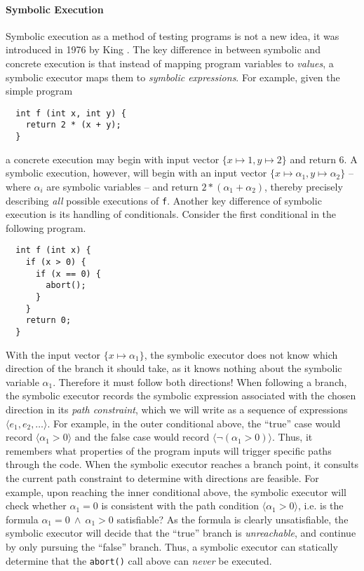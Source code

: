 \paragraph{Symbolic Execution}
Symbolic execution as a method of testing programs is not a new idea, it
was introduced in 1976 by King \cite{king_symbolic_1976}.
%
The key difference in between symbolic and concrete execution is that
instead of mapping program variables to \emph{values}, a symbolic
executor maps them to \emph{symbolic expressions}.
%
For example, given the simple program
%
\begin{verbatim}
  int f (int x, int y) {
    return 2 * (x + y);
  }
\end{verbatim}
%
a concrete execution may begin with input vector
$\{x \mapsto 1, y \mapsto 2\}$ and return $6$.
%
A symbolic execution, however, will begin with an input vector
$\{x \mapsto \alpha_1, y \mapsto \alpha_2\}$ -- where $\alpha_i$ are
symbolic variables -- and return $2 * (\alpha_1 + \alpha_2)$, thereby
precisely describing \emph{all} possible executions of \verb~f~.
%
Another key difference of symbolic execution is its handling of
conditionals. Consider the first conditional in the following program.
%
\begin{verbatim}
  int f (int x) {
    if (x > 0) {
      if (x == 0) {
        abort();
      }
    }
    return 0;
  }
\end{verbatim}
%
With the input vector $\{x \mapsto \alpha_1\}$, the symbolic executor
does not know which direction of the branch it should take, as it knows
nothing about the symbolic variable $\alpha_1$.
%
Therefore it must follow both directions!
%
When following a branch, the symbolic executor records the symbolic
expression associated with the chosen direction in its \emph{path
  constraint}, which we will write as a sequence of expressions
$\langle e_1, e_2, \ldots \rangle$.
%
For example, in the outer conditional above, the ``true'' case would
record $\langle \alpha_1 > 0 \rangle$ and the false case would record
$\langle \lnot (\alpha_1 > 0) \rangle$.
%
Thus, it remembers what properties of the program inputs will trigger
specific paths through the code.
%
When the symbolic executor reaches a branch point, it consults the
current path constraint to determine with directions are feasible.
%
For example, upon reaching the inner conditional above, the symbolic
executor will check whether $\alpha_1 = 0$ is consistent with the path
condition $\langle \alpha_1 > 0 \rangle$, i.e. is the formula
$\alpha_1 = 0\ \land\ \alpha_1 > 0$ satisfiable?
%
As the formula is clearly unsatisfiable, the symbolic executor will
decide that the ``true'' branch is \emph{unreachable}, and continue by
only pursuing the ``false'' branch.
%
Thus, a symbolic executor can statically determine that the
\verb~abort()~ call above can \emph{never} be executed.


